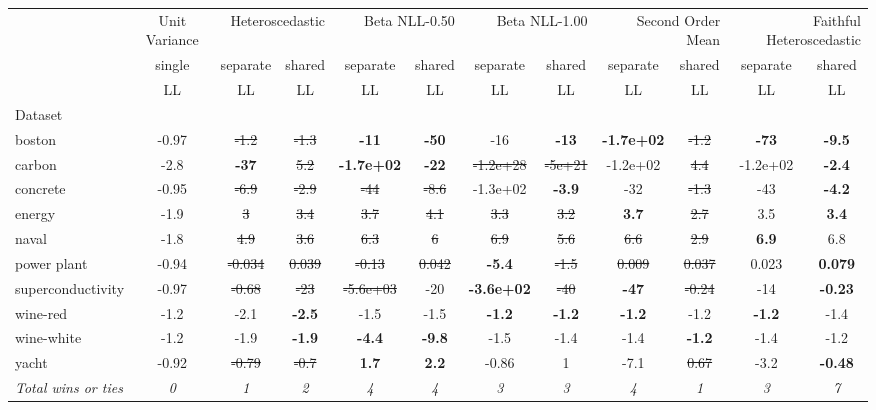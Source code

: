 \begin{tabular}{l|c|cc|cc|cc|cc|cc}
\toprule
{} & {Unit Variance} & \multicolumn{2}{r}{Heteroscedastic} & \multicolumn{2}{r}{Beta NLL-0.50} & \multicolumn{2}{r}{Beta NLL-1.00} & \multicolumn{2}{r}{Second Order Mean} & \multicolumn{2}{r}{Faithful Heteroscedastic} \\
{} & {single} & {separate} & {shared} & {separate} & {shared} & {separate} & {shared} & {separate} & {shared} & {separate} & {shared} \\
{} & {LL} & {LL} & {LL} & {LL} & {LL} & {LL} & {LL} & {LL} & {LL} & {LL} & {LL} \\
{Dataset} & {} & {} & {} & {} & {} & {} & {} & {} & {} & {} & {} \\
\midrule
boston & -0.97 & \sout{-1.2} & \sout{-1.3} & \textbf{-11} & \textbf{-50} & -16 & \textbf{-13} & \textbf{-1.7e+02} & \sout{-1.2} & \textbf{-73} & \textbf{-9.5} \\
carbon & -2.8 & \textbf{-37} & \sout{5.2} & \textbf{-1.7e+02} & \textbf{-22} & \sout{-1.2e+28} & \sout{-5e+21} & -1.2e+02 & \sout{4.4} & -1.2e+02 & \textbf{-2.4} \\
concrete & -0.95 & \sout{-6.9} & \sout{-2.9} & \sout{-44} & \sout{-8.6} & -1.3e+02 & \textbf{-3.9} & -32 & \sout{-1.3} & -43 & \textbf{-4.2} \\
energy & -1.9 & \sout{3} & \sout{3.4} & \sout{3.7} & \sout{4.1} & \sout{3.3} & \sout{3.2} & \textbf{3.7} & \sout{2.7} & 3.5 & \textbf{3.4} \\
naval & -1.8 & \sout{4.9} & \sout{3.6} & \sout{6.3} & \sout{6} & \sout{6.9} & \sout{5.6} & \sout{6.6} & \sout{2.9} & \textbf{6.9} & 6.8 \\
power plant & -0.94 & \sout{-0.034} & \sout{0.039} & \sout{-0.13} & \sout{0.042} & \textbf{-5.4} & \sout{-1.5} & \sout{0.009} & \sout{0.037} & 0.023 & \textbf{0.079} \\
superconductivity & -0.97 & \sout{-0.68} & \sout{-23} & \sout{-5.6e+03} & -20 & \textbf{-3.6e+02} & \sout{-40} & \textbf{-47} & \sout{-0.24} & -14 & \textbf{-0.23} \\
wine-red & -1.2 & -2.1 & \textbf{-2.5} & -1.5 & -1.5 & \textbf{-1.2} & \textbf{-1.2} & \textbf{-1.2} & -1.2 & \textbf{-1.2} & -1.4 \\
wine-white & -1.2 & -1.9 & \textbf{-1.9} & \textbf{-4.4} & \textbf{-9.8} & -1.5 & -1.4 & -1.4 & \textbf{-1.2} & -1.4 & -1.2 \\
yacht & -0.92 & \sout{-0.79} & \sout{-0.7} & \textbf{1.7} & \textbf{2.2} & -0.86 & 1 & -7.1 & \sout{0.67} & -3.2 & \textbf{-0.48} \\
\textit{{Total wins or ties}} & \textit{0} & \textit{1} & \textit{2} & \textit{4} & \textit{4} & \textit{3} & \textit{3} & \textit{4} & \textit{1} & \textit{3} & \textit{7} \\
\bottomrule
\end{tabular}
